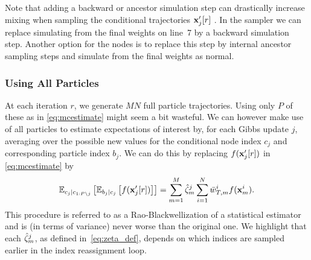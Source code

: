 Note that adding a backward or ancestor simulation step can drastically increase mixing when sampling the conditional trajectories $\mathbf{x}_j'[r]$ \citep{lindsten2013backward}. In the \ipmcmc sampler we can replace simulating from the final weights on line~7 by a backward simulation step. Another option for the \csmc nodes is to replace this step by internal ancestor sampling \citep{lindstenJS2014} steps and simulate from the final weights as normal.



\subsubsection{Using All Particles}
\label{sec:allparticles}
At each \mcmc iteration $r$, we generate $MN$ full particle trajectories. Using only $P$ of these as in \eqref{eq:mcestimate} might seem a bit wasteful. We can however make use of all particles to estimate expectations of interest by, for each Gibbs update $j$, averaging over the possible new values for the conditional node index $c_j$ and corresponding particle index $b_j$. We can do this by replacing $f(\mathbf{x}_j'[r])$ in \eqref{eq:mcestimate} by
\begin{align*}
\mathbb{E}_{c_j|c_{1:P\backslash j}}\left[\mathbb{E}_{b_j | c_j}\left[f(\mathbf{x}_j'[r])\right]\right] 
= \sum_{m=1}^M 
\hat{\zeta}_{m}^j
\sum_{i=1}^N
\bar w_{T,m}^i f(\mathbf{x}_{m}^i).
\end{align*}
This procedure is referred to as a Rao-Blackwellization of a statistical estimator and is (in terms of variance) never worse than the original one.  We highlight that each $\hat{\zeta}_{m}^j$, as defined in~\eqref{eq:zeta_def}, depends on which indices are sampled earlier in the index reassignment loop.  

